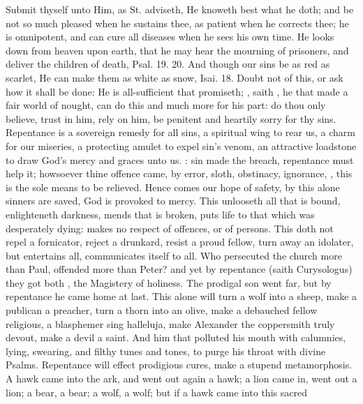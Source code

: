 {Submit thyself unto Him, as St. \Austin{} adviseth, He knoweth best
what he doth; and be not so much pleased when he sustains thee, as
patient when he corrects thee; he is omnipotent, and can cure all
diseases when he sees his own time. He looks down from heaven upon
earth, that he may hear the mourning of prisoners, and deliver the
children of death, Psal.  19. 20. And though our sins be as red as
scarlet, He can make them as white as snow, Isai.  18. Doubt not of
this, or ask how it shall be done: He is all-sufficient that promiseth;
, saith \Chrysostom{}, he that made a fair
world of nought, can do this and much more for his part: do thou only
believe, trust in him, rely on him, be penitent and heartily sorry for
thy sins. Repentance is a sovereign remedy for all sins, a spiritual
wing to rear us, a charm for our miseries, a protecting amulet to expel
sin's venom, an attractive loadstone to draw God's mercy and graces
unto us. : sin made the
breach, repentance must help it; howsoever thine offence came, by
error, sloth, obstinacy, ignorance, , this is
the sole means to be relieved. Hence comes our hope of safety, by
this alone sinners are saved, God is provoked to mercy. This unlooseth
all that is bound, enlighteneth darkness, mends that is broken, puts
life to that which was desperately dying: makes no respect of offences,
or of persons. This doth not repel a fornicator, reject a
drunkard, resist a proud fellow, turn away an idolater, but entertains
all, communicates itself to all. Who persecuted the church more than
Paul, offended more than Peter? and yet by repentance (saith
Curysologus) they got both , the
Magistery of holiness. The prodigal son went far, but by repentance he
came home at last. This alone will turn a wolf into a sheep, make
a publican a preacher, turn a thorn into an olive, make a debauched
fellow religious, a blasphemer sing halleluja, make Alexander the
coppersmith truly devout, make a devil a saint. And him that
polluted his mouth with calumnies, lying, swearing, and filthy tunes
and tones, to purge his throat with divine Psalms. Repentance will
effect prodigious cures, make a stupend metamorphosis. A hawk came into
the ark, and went out again a hawk; a lion came in, went out a lion; a
bear, a bear; a wolf, a wolf; but if a hawk came into this sacred
}

